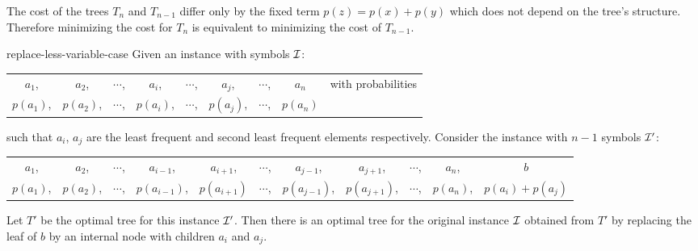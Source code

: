 \begin{observation*}
	The cost of the trees $T_n$ and $T_{n-1}$ differ only by the fixed term $p(z)=p(x)+p(y)$ which does not depend on the tree's structure. Therefore minimizing the cost for $T_n$ is equivalent to minimizing the cost of $T_{n-1}$.
\end{observation*}
\begin{Theorem}{}{replace-less-variable-case}
	Given an instance with symbols $\mathcal{I}$: \begin{center}
		\begin{tabular}{ccccccccc}
			$a_1$, & $a_2$, & $\cdots$, & $a_i$, & $\cdots$, & $a_j$, & $\cdots$, & $a_n$ & with probabilities\\
			$p(a_1)$, & $p(a_2)$, & $\cdots$, & $p(a_i)$, & $\cdots$, & $p(a_j)$, & $\cdots$, & $p(a_n)$ &
		\end{tabular} 
	\end{center}
	such that $a_i$, $a_j$ are the least frequent and second least frequent elements respectively. Consider the instance with $n-1$ symbols $\mathcal{I}'$:
	\begin{center}
		\begin{tabular}{ccccccccccc}
			$a_1$, & $a_2$, & $\cdots$, & $a_{i-1}$, & $a_{i+1}$,& $\cdots$, & $a_{j-1}$,& $a_{j+1}$, & $\cdots$, & $a_n$, & $b$ \\
			$p(a_1)$, & $p(a_2)$, & $\cdots$, & $p(a_{i-1})$,&$p(a_{i+1})$  & $\cdots$, & $p(a_{j-1})$,& $p(a_{j+1})$, & $\cdots$, & $p(a_n)$, & $p(a_i)+p(a_j)$ 
		\end{tabular} 
	\end{center}
	Let $T'$ be the optimal tree for this instance $\mathcal{I}'$. Then there is an optimal tree for the original instance $\mathcal{I}$ obtained from $T'$ by replacing the leaf of $b$ by an internal node with children $a_i$ and $a_j$.
\end{Theorem}
